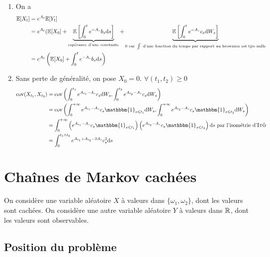 \begin{enumerate}
\item On a
  \begin{equation*}
  \begin{split}
    \mathbb{E}[X_t] &= e^{A_t}\mathbb{E}[Y_t] \\
    &= e^{A_t}( \mathbb{E}[X_0] + \underbrace{\mathbb{E}\left[ \int_{0}^{t} e^{-A_s} b_s \mathrm{d} s\right]}_{\text{espérance d'une constante}} + \underbrace{\mathbb{E}\left[ \int_{0}^{t} e^{-A_s} c_s \mathrm{d} W_s\right]}_{0 \text{ car } \int \text{ d'une fonction du temps par rapport au brownien est tjrs nulle}} \\
    &= e^{A_t}\left(\mathbb{E}[X_0] + \int_{0}^{t} e^{-A_s} b_s \mathrm{d} s\right)
  \end{split}
  \end{equation*}
  
\item Sans perte de généralité, on pose $X_0 = 0$. $\forall (t_1, t_2) \geq 0$
  \newcommand{\tu}{t_1}
  \newcommand{\td}{t_2}
  \begin{equation*}
  \begin{split} 
    \cov(X_{\tu}, X_{\td}) &= \cov \left( \int_{0}^{\tu} e^{A_{\tu} -A_s}c_s \der \ws, \int_{0}^{\td} e^{A_{\td} - A_s} c_s \der \ws \right) \\
    &= \cov \left( \int_{0}^{+\infty} e^{A_{\tu}-A_s} c_s \mathbbm{1}_{s\leq \tu} \der \ws, \int_{0}^{+\infty} e^{A_{\td}-A_s} c_s \mathbbm{1}_{s\leq \td} \der \ws\right) \\
    &= \int_{0}^{+\infty} \left( e^{A_{\tu}-A_s} c_s \mathbbm{1}_{s \leq \tu} \right) \left( e^{A_{\td}-A_s} c_s \mathbbm{1}_{s \leq \td} \right) \der s \text{ par l'isométrie d'\textsc{Itô}} \\
    &= \int_{0}^{\tu \wedge \td} e^{A_{\tu} + A_{\td} - 2 A_s} c_s^2 \der s
  \end{split}
  \end{equation*}

\end{enumerate}

\chapter{Chaînes de Markov cachées}

On considère une variable aléatoire $X$ à valeurs dans $\{\omega_1, \omega_2 \}$, dont les valeurs sont cachées. On considère une autre variable aléatoire $Y$ à valeurs dans $\mathbb{R}$, dont les valeurs sont observables. \\

\section{Position du problème}

